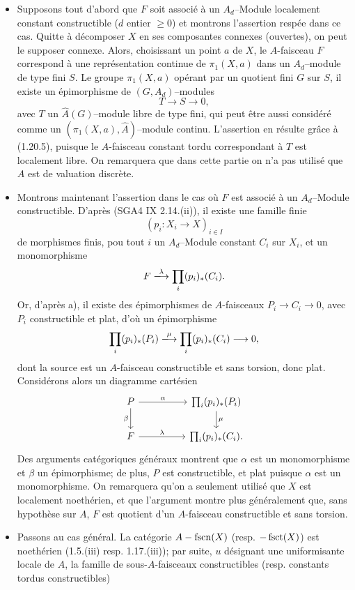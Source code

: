 \begin{itemize}
    \item[a)] Supposons tout d'abord que $F$ soit associé à un $A_d$--Module localement constant constructible ($d$ entier $\geq 0$) et montrons l'assertion respée dans ce cas. Quitte à décomposer $X$ en ses composantes connexes (ouvertes), on peut le supposer connexe. Alors, choisissant un point $a$ de $X$, le $A$-faisceau $F$ correspond à une représentation continue  de $\pi_1(X, a)$ dans un $A_d$--module de type fini $S$. Le groupe $\pi_1(X, a)$ opérant par un quotient fini $G$ sur $S$, il existe un épimorphisme de $(G, A_d)$--modules
    $$
    T \to S \to 0,
    $$
    avec $T$ un $\hat{A}(G)$--module libre de type fini, qui peut être aussi considéré comme un $(\pi_1(X, a), \hat{A})$--module continu. L'assertion en résulte grâce à (1.20.5), puisque le $A$-faisceau constant tordu correspondant à $T$ est localement libre. On remarquera que dans cette partie on n'a pas utilisé que $A$ est de valuation discrète. 
    \item[b)] Montrons maintenant l'assertion dans le cas où $F$ est associé à un $A_d$--Module constructible. D'après (SGA4 IX 2.14.(ii)), il existe une famille finie
    $$
    (p_i: X_i \to X)_{i \in I}
    $$
    de morphismes finis, pou tout $i$ un $A_d$--Module constant $C_i$ sur $X_i$, et un monomorphisme 
    $$
    F \xlongrightarrow{\lambda} \prod_i (p_i)_*(C_i).
    $$
    Or, d'après a), il existe des épimorphismes de $A$-faisceaux $P_i \to C_i \to 0$, avec $P_i$ constructible et plat, d'où un épimorphisme
    $$
    \prod_i(p_i)_*(P_i) \xlongrightarrow{\mu} \prod_i (p_i)_*(C_i) \to 0,
    $$dont la source est un $A$-faisceau constructible et sans torsion, donc plat. Considérons alors un diagramme cartésien
    \[\begin{tikzcd}
	P && {\prod_i(p_i)_*(P_i)} \\
	F && {\prod_i(p_i)_*(C_i).}
	\arrow["\beta"', from=1-1, to=2-1]
	\arrow["\lambda", from=2-1, to=2-3]
	\arrow["\alpha", from=1-1, to=1-3]
	\arrow["\mu", from=1-3, to=2-3]
    \end{tikzcd}\]
    Des arguments catégoriques généraux montrent que $\alpha$ est un monomorphisme et $\beta$ un épimorphisme; de plus, $P$ est constructible, et plat puisque $\alpha$ est un monomorphisme. On remarquera qu'on a seulement utilisé que $X$ est localement noethérien, et que l'argument montre plus généralement que, sans hypothèse sur $A$, $F$ est quotient d'un $A$-faisceau constructible et sans torsion.
    \item[c)] Passons au cas général. La catégorie $A-\operatorname{fscn}(X)$ (resp. $-\operatorname{fsct}(X)$) est noethérien (1.5.(iii) resp. 1.17.(iii)); par suite, $u$ désignant une uniformisante locale de $A$, la famille de sous-$A$-faisceaux constructibles (resp. constants tordus constructibles)

\end{itemize}
